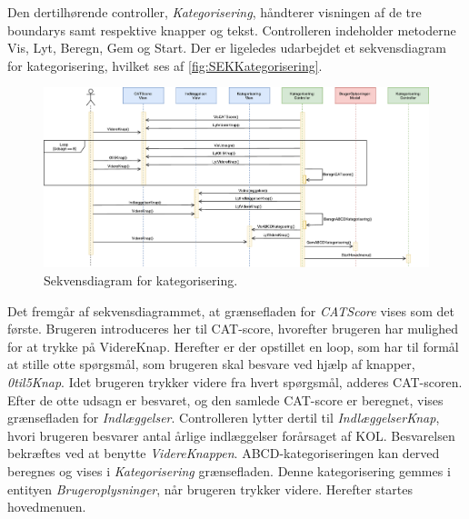 Den dertilhørende controller, \textit{Kategorisering}, håndterer visningen af de tre boundarys samt respektive knapper og tekst. Controlleren indeholder metoderne Vis, Lyt, Beregn, Gem og Start. 
Der er ligeledes udarbejdet et sekvensdiagram for kategorisering, hvilket ses af \autoref{fig:SEKKategorisering}.

\begin{figure} [H]
\centering
\includegraphics[width=1.3\textwidth, angle=90]{figures/Sek/SEKKategorisering}
\caption{Sekvensdiagram for kategorisering.}
\label{fig:SEKKategorisering}
\end{figure}

\noindent
Det fremgår af sekvensdiagrammet, at grænsefladen for \textit{CATScore} vises som det første. Brugeren introduceres her til CAT-score, hvorefter brugeren har mulighed for at trykke på VidereKnap. Herefter er der opstillet en loop, som har til formål at stille otte spørgsmål, som brugeren skal besvare ved hjælp af knapper, \textit{0til5Knap}. Idet brugeren trykker videre fra hvert spørgsmål, adderes CAT-scoren. Efter de otte udsagn er besvaret, og den samlede CAT-score er beregnet, vises grænsefladen for \textit{Indlæggelser}. Controlleren lytter dertil til \textit{IndlæggelserKnap}, hvori brugeren besvarer antal årlige indlæggelser forårsaget af KOL. Besvarelsen bekræftes ved at benytte \textit{VidereKnappen}. ABCD-kategoriseringen kan derved beregnes og vises i \textit{Kategorisering} grænsefladen. Denne kategorisering gemmes i entityen \textit{Brugeroplysninger}, når brugeren trykker videre. Herefter startes hovedmenuen.
